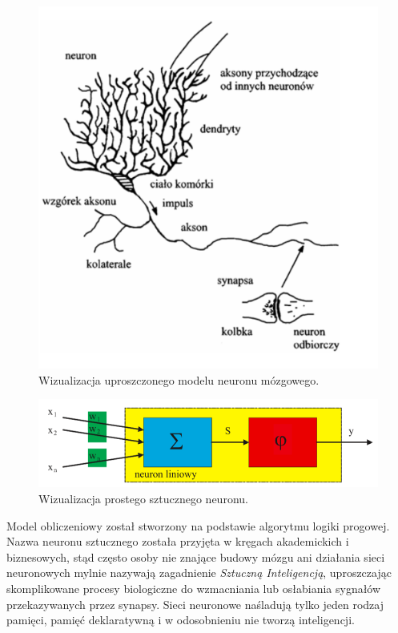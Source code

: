 \documentclass[12pt,a4paper,twoside,titlepage,openright]{book}
\begin{document}
\begin{figure}[ht]
	\centering
			\includegraphics[resolution=100, scale=0.7]{neuronMozgowy.png}
		\caption{Wizualizacja uproszczonego modelu neuronu mózgowego.}
\end{figure}

\begin{figure}[ht]
	\centering
			\includegraphics[resolution=100, scale=0.68]{sztucznyNeuron.png}
		\caption{Wizualizacja prostego sztucznego neuronu.}
\end{figure}

Model obliczeniowy został stworzony na podstawie algorytmu logiki progowej. 
Nazwa neuronu sztucznego została przyjęta w kręgach akademickich i biznesowych, stąd często osoby nie znające budowy mózgu ani działania sieci neuronowych mylnie nazywają zagadnienie \textit{Sztuczną Inteligencją}, uproszczając skomplikowane procesy biologiczne do wzmacniania lub osłabiania sygnałów przekazywanych przez synapsy. Sieci neuronowe naśladują tylko jeden rodzaj pamięci, pamięć deklaratywną i w odosobnieniu nie tworzą inteligencji.
\end{document}
